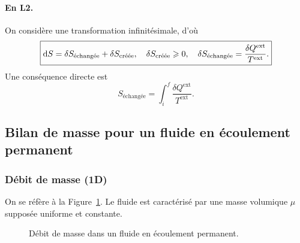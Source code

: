             \paragraph{En L2.}
                On considère une transformation infinitésimale, d'où
                \begin{equation*}
                    \boxed{
                        \mathrm{d} S=\delta S_{\text{échangée}}+\delta S_{\text{créée}},\quad\delta S_{\text{créée}}\geqslant0,\quad\delta S_{\text{échangée}}=\frac{\delta Q^{\text{ext}}}{T^{\text{ext}}}.
                    }
                \end{equation*}
                Une conséquence directe est 
                \begin{equation*}
                    S_{\text{échangée}}=\int_{i}^{f}\frac{\delta Q^{\text{ext}}}{T^{\text{ext}}}.
                \end{equation*}

    \subsection{Bilan de masse pour un fluide en écoulement permanent}
        \subsubsection{Débit de masse (1D)}

            On se réfère à la Figure~\ref{fig:debit_masse_fluide_ecoulement_permanent}. Le fluide est caractérisé par une masse volumique $\mu$ supposée uniforme et constante.

            \begin{figure}
                \centering
                \caption{Débit de masse dans un fluide en écoulement permanent.}    
                \label{fig:debit_masse_fluide_ecoulement_permanent}
            \end{figure}

